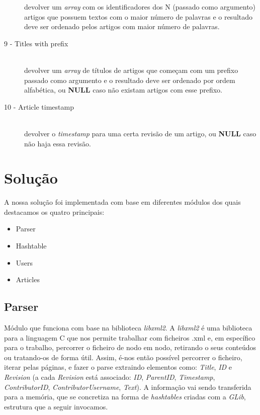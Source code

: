 \documentclass[a4paper]{article}
\begin{document}
\begin{description}
devolver um \textit{array} com os identificadores dos N (passado como argumento) artigos que possuem textos com o maior número de palavras e o resultado deve ser ordenado pelos artigos com maior número de palavras.
\item[9 - Titles with prefix]\hfill \\
devolver um \textit{array} de títulos de artigos que começam com um prefixo passado como argumento e o resultado deve ser ordenado por ordem alfabética, ou \textbf{NULL} caso não existam artigos com esse prefixo.
\item[10 - Article timestamp]\hfill \\
devolver o \textit{timestamp} para uma certa revisão de um artigo, ou \textbf{NULL} caso não haja essa revisão.
\end{description}

\section{Solução}
A nossa solução foi implementada com base em diferentes módulos dos quais destacamos os quatro principais:

\begin{itemize}
    \item Parser
    \item Hashtable
    \item Users
    \item Articles
\end{itemize}
\label{sec:solucao}

\subsection{Parser}
Módulo que funciona com base na biblioteca \textit{libxml2}. A \textit{libxml2} é uma biblioteca para a linguagem C que nos permite trabalhar com ficheiros .xml e, em específico para o trabalho, percorrer o ficheiro de nodo em nodo, retirando o seus conteúdos ou tratando-os de forma útil.
Assim, é-nos então possível percorrer o ficheiro, iterar pelas páginas, e fazer o parse extraindo elementos como: \textit{Title}, \textit{ID} e \textit{Revision} (a cada \textit{Revision} está associado: \textit{ID}, \textit{ParentID}, \textit{Timestamp}, \textit{ContributorID}, \textit{ContributorUsername}, \textit{Text}).
A informação vai sendo transferida para a memória, que se concretiza na forma de \textit{hashtables} criadas com a \textit{GLib}, estrutura que a seguir invocamos.
\end{document}
